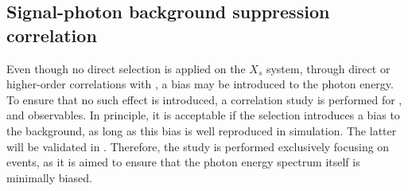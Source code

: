 \subsection{Signal-photon background suppression correlation}\label{sec:signal_photon_correlation}

Even though no direct selection is applied on the $X_s$ system, through direct or higher-order correlations with \EB, a bias may be introduced to the photon energy.
To ensure that no such effect is introduced, a correlation study is performed for \piVeto, \etaVeto and \ZMVA observables.
In principle, it is acceptable if the selection introduces a bias to the background, as long as this bias is well reproduced in simulation.
The latter will be validated in .
Therefore, the study is performed exclusively focusing on \BtoXsgamma events, as it is aimed to ensure that the photon energy spectrum itself is minimally biased.

